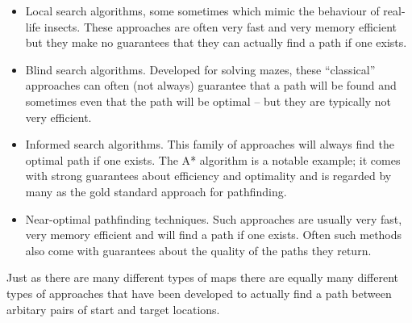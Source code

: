 \begin{itemize}
\item Local search algorithms, some sometimes which mimic the behaviour of real-life insects. 
These approaches are often very fast and very memory efficient but they make no guarantees that 
they can actually find a path if one exists.
\item Blind search algorithms. Developed for solving mazes,  these ``classical'' approaches can
often (not always) guarantee that a path will be found and sometimes even that the path
will be optimal -- but they are typically not very efficient.
\item Informed search algorithms. This family of approaches will always find the optimal path if 
one exists. The A{*} algorithm is a notable example; it comes with strong guarantees about
efficiency and optimality and is regarded by many as the gold standard approach for pathfinding. 
\item Near-optimal pathfinding techniques. Such approaches are usually very fast, very memory
efficient and will find a path if one exists. Often such methods also come with guarantees
about the quality of the paths they return.
\end{itemize}


Just as there are many different types of maps there are equally many different types of approaches that have 
been developed to actually find a path between arbitary pairs of start and target locations.


